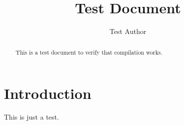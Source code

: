 \documentclass[conference,a4paper]{IEEEtran}
\title{Test Document}
\author{Test Author}
\begin{document}
\maketitle

\begin{abstract}
This is a test document to verify that compilation works.
\end{abstract}

\section{Introduction}
This is just a test.
\end{document}
